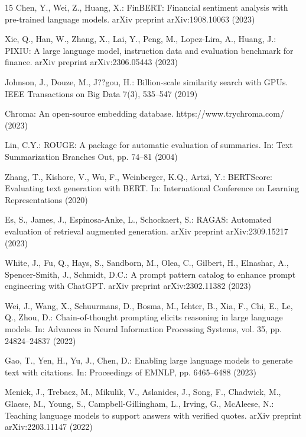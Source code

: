 \documentclass[runningheads]{llncs}
\begin{document}
\begin{thebibliography}{15}
Chen, Y., Wei, Z., Huang, X.: FinBERT: Financial sentiment analysis with pre-trained language models. arXiv preprint arXiv:1908.10063 (2023)

Xie, Q., Han, W., Zhang, X., Lai, Y., Peng, M., Lopez-Lira, A., Huang, J.: PIXIU: A large language model, instruction data and evaluation benchmark for finance. arXiv preprint arXiv:2306.05443 (2023)

Johnson, J., Douze, M., J??gou, H.: Billion-scale similarity search with GPUs. IEEE Transactions on Big Data 7(3), 535--547 (2019)

Chroma: An open-source embedding database. https://www.trychroma.com/ (2023)

Lin, C.Y.: ROUGE: A package for automatic evaluation of summaries. In: Text Summarization Branches Out, pp. 74--81 (2004)

Zhang, T., Kishore, V., Wu, F., Weinberger, K.Q., Artzi, Y.: BERTScore: Evaluating text generation with BERT. In: International Conference on Learning Representations (2020)

Es, S., James, J., Espinosa-Anke, L., Schockaert, S.: RAGAS: Automated evaluation of retrieval augmented generation. arXiv preprint arXiv:2309.15217 (2023)

White, J., Fu, Q., Hays, S., Sandborn, M., Olea, C., Gilbert, H., Elnashar, A., Spencer-Smith, J., Schmidt, D.C.: A prompt pattern catalog to enhance prompt engineering with ChatGPT. arXiv preprint arXiv:2302.11382 (2023)

Wei, J., Wang, X., Schuurmans, D., Bosma, M., Ichter, B., Xia, F., Chi, E., Le, Q., Zhou, D.: Chain-of-thought prompting elicits reasoning in large language models. In: Advances in Neural Information Processing Systems, vol. 35, pp. 24824--24837 (2022)

Gao, T., Yen, H., Yu, J., Chen, D.: Enabling large language models to generate text with citations. In: Proceedings of EMNLP, pp. 6465--6488 (2023)

Menick, J., Trebacz, M., Mikulik, V., Aslanides, J., Song, F., Chadwick, M., Glaese, M., Young, S., Campbell-Gillingham, L., Irving, G., McAleese, N.: Teaching language models to support answers with verified quotes. arXiv preprint arXiv:2203.11147 (2022)

\end{thebibliography}
\end{document}
